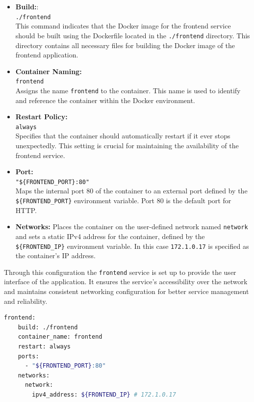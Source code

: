 \begin{itemize}
    \item \textbf{Build:}: \\ \verb|./frontend| \\ This command indicates that the Docker image for the frontend service should be built using the Dockerfile located in the \texttt{./frontend} directory. This directory contains all necessary files for building the Docker image of the frontend application.

    \item \textbf{Container Naming:} \\ \verb|frontend| \\ Assigns the name \texttt{frontend} to the container. This name is used to identify and reference the container within the Docker environment.

    \item \textbf{Restart Policy:} \\ \verb|always| \\ Specifies that the container should automatically restart if it ever stops unexpectedly. This setting is crucial for maintaining the availability of the frontend service.

    \item \textbf{Port:} \\ \verb|"${FRONTEND_PORT}:80"| \\ Maps the internal port 80 of the container to an external port defined by the \texttt{\$\{FRONTEND\_PORT\}} environment variable. Port 80 is the default port for HTTP.

    \item \textbf{Networks:} Places the container on the user-defined network named \texttt{network} and sets a static IPv4 address for the container, defined by the \texttt{\$\{FRONTEND\_IP\}} environment variable. In this case \texttt{172.1.0.17} is specified as the container's IP address.
\end{itemize}

Through this configuration the \texttt{frontend} service is set up to provide the user interface of the application. It ensures the service's accessibility over the network and maintains consistent networking configuration for better service management and reliability.


\begin{lstlisting}[language=bash, caption=Frontend Docker Compose, label={lst:frontend_docker_compose}]
frontend: 
    build: ./frontend
    container_name: frontend
    restart: always
    ports:
      - "${FRONTEND_PORT}:80"
    networks:
      network:
        ipv4_address: ${FRONTEND_IP} # 172.1.0.17
\end{lstlisting}

